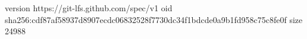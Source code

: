 version https://git-lfs.github.com/spec/v1
oid sha256:cdf87af58937d8907ecdc06832528f7730dc34f1bdcde0a9b1fd958c75c8fe0f
size 24988
